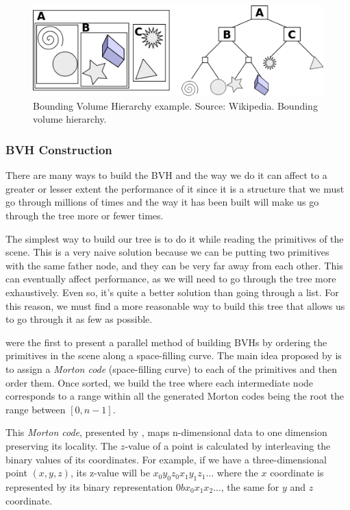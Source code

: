 \documentclass[titlepage,12pt]{report}
\begin{document}
\begin{figure}[H]
	\centering
	\includegraphics[scale=0.65]{media/BVH_example.png}
	\caption{Bounding Volume Hierarchy example. Source: Wikipedia. Bounding volume hierarchy.}
	\label{bvh1}
\end{figure}

\subsubsection{BVH Construction}

There are many ways to build the BVH and the way we do it can affect to a greater or lesser extent the performance of it since it is a structure that we must go through millions of times and the way it has been built will make us go through the tree more or fewer times.

The simplest way to build our tree is to do it while reading the primitives of the scene.  This is a very naive solution because we can be putting two primitives with the same father node, and they can be very far away from each other. This can eventually affect performance, as we will need to go through the tree more exhaustively. Even so, it's quite a better solution than going through a list. For this reason, we must find a more reasonable way to build this tree that allows us to go through it as few as possible.

\citep[p.~375--384]{Lauterbach2009} were the first to present a parallel method of building BVHs by ordering the primitives in the scene along a space-filling curve. The main idea proposed by \citep[p.~375--384]{Lauterbach2009} is to assign a \textit{Morton code} (space-filling curve) to each of the primitives and then order them. Once sorted, we build the tree where each intermediate node corresponds to a range within all the generated Morton codes being the root the range between $[0, n-1]$.

This \textit{Morton code}, presented by \citep{Morton1966ACO}, maps n-dimensional data to one dimension preserving its locality. The $z$-value of a point is calculated by interleaving the binary values of its coordinates. For example, if we have a three-dimensional point $(x,y,z)$, its z-value will be $x_0y_0z_0x_1y_1z_1...$ where the $x$ coordinate is represented by its binary representation $0bx_0x_1x_2...$, the same for $y$ and $z$ coordinate.
\end{document}
